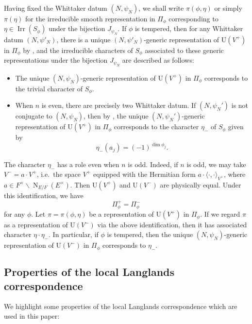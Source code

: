 \documentclass[11pt]{amsart}
\numberwithin{equation}{section}
\theoremstyle{plain}
\theoremstyle{definition}
\theoremstyle{remark}
\def\Irr{\operatorname{Irr}}
\def\N{\operatorname{N}}
\def\U{\mathrm{U}}
\begin{document}
Having fixed the Whittaker datum $(N, \psi_N)$, we shall write $\pi(\phi, \eta)$ or simply $\pi(\eta)$ for the irreducible smooth representation in $\Pi_{\phi}$ corresponding to $\eta \in \Irr(S_{\phi})$ under the bijection $J_{\psi_N}$.
If $\phi$ is tempered, then for any Whittaker datum $(N, \psi'_N)$,
there is a unique $(N,\psi'_N)$-generic representation of $\U(V^+)$ in $\Pi_{\phi}$ by \cite[Lemme 7.10.1]{bp2},
and the irreducible characters of $S_{\phi}$ associated to these generic representations under the bijection $J_{\psi_N}$ are described as follows:
\begin{itemize}
 \item The unique $(N,\psi_N)$-generic representation of $\U(V^+)$ in $\Pi_\phi$ corresponds to the trivial character of $S_{\phi}$.
 \item When $n$ is even, there are precisely two Whittaker datum.
 If $(N, \psi_N')$ is not conjugate to $(N, \psi_N)$, then by \cite[\S 3]{ka},
 the unique $(N,\psi_N')$-generic representation of $\U(V^+)$ in $\Pi_\phi$ corresponds to the character $\eta_-$ of $S_{\phi}$ given by
\[
 \eta_-(a_j) = (-1)^{\dim \phi_j}.
\]
\end{itemize}
The character $\eta_-$ has a role even when $n$ is odd.
Indeed, if $n$ is odd, we may take $V^- = a \cdot V^+$, 
i.e.~the space $V^+$ equipped with the Hermitian form $a \cdot \langle \cdot, \cdot \rangle_{V^+}$,
where $a \in F^{\times} \smallsetminus \N_{E/F}(E^{\times})$.
Then $\U(V^+)$ and $\U(V^-)$ are physically equal.
Under this identification, we have
\[
 \Pi^+_{\phi} = \Pi^-_{\phi}
\]
for any $\phi$.
Let $\pi = \pi(\phi, \eta)$ be a representation of $\U(V^+)$ in $\Pi_{\phi}$.
If we regard $\pi$ as a representation of $\U(V^-)$ via the above identification,
then it has associated character $\eta \cdot \eta_-$.
In particular, if $\phi$ is tempered, then the unique $(N,\psi_N)$-generic representation of $\U(V^-)$ in $\Pi_\phi$ corresponds to $\eta_-$.

\subsection{Properties of the local Langlands correspondence}
\label{SS:llc}

We highlight some properties of the local Langlands correspondence which are used in this paper:
\end{document}
